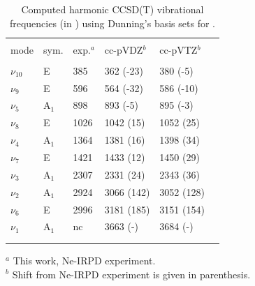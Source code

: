 \begin{table}[h]
\caption{Computed harmonic CCSD(T) vibrational frequencies (in \wn) using Dunning's basis sets for \pa. }\label{tab:CH3CNH+:tab2}
\begin{center}
    \begin{tabular}{llllll} \hline\hline\\
       mode         & sym.  & exp.$^a$  & cc-pVDZ$^b$ & cc-pVTZ$^b$ \\\hline\\
       $\nu_{10}$   & E	    & 385       & 362  (-23)	  & 380  (-5)    \\
       $\nu_9$      & E	    & 596       & 564  (-32)	  & 586  (-10)   \\
       $\nu_5$      & A$_1$	& 898       & 893  (-5)	  & 895  (-3)    \\
       $\nu_8$\     & E	    & 1026      & 1042 (15)  & 1052 (25)  \\
       $\nu_4$      & A$_1$	& 1364      & 1381 (16)  & 1398 (34)  \\
       $\nu_7$      & E	    & 1421      & 1433 (12)  & 1450 (29)  \\
       $\nu_3$      & A$_1$	& 2307      & 2331 (24)  & 2343 (36)  \\
       $\nu_2$      & A$_1$	& 2924      & 3066 (142) & 3052 (128) \\
       $\nu_6$      & E	    & 2996      & 3181 (185) & 3151 (154) \\
       $\nu_1$      & A$_1$	& nc        & 3663 (-)	  & 3684 (-)    \\
        \\
        \hline\hline\\
    \end{tabular}
    
    $^a$ This work, Ne-IRPD experiment.\\
    $^b$ Shift from Ne-IRPD experiment is given in parenthesis.
\end{center}

\end{table}

